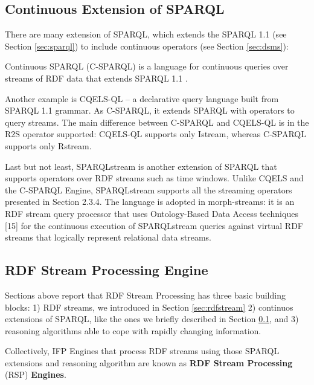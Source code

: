 \subsection{Continuous Extension of SPARQL}\label{sec:continuous-sparql}

There are many extension of SPARQL, which extends the SPARQL 1.1 (see Section \ref{sec:sparql}) to include continuous operators (see Section \ref{sec:dsms}):

Continuous SPARQL (C-SPARQL)  is a language for continuous queries over streams of RDF data that extends SPARQL 1.1 \cite{Barbieri:2010:QRS:1860702.1860705}.

Another example is CQELS-QL \cite{Lephuoc2011} – a declarative query language built from SPARQL 1.1 grammar. As C-SPARQL, it extends SPARQL with operators to query streams. The main difference between C-SPARQL and CQELS-QL is in the R2S operator supported: CQELS-QL supports only Istream, whereas C-SPARQL supports only Rstream. 

Last but not least, SPARQLstream \cite{Calbimonte:2010:EOA:1940281.1940289} is another extension of SPARQL that supports operators over RDF streams such as time windows. Unlike CQELS and the C-SPARQL Engine, SPARQLstream supports all the streaming operators presented in Section 2.3.4. The language is adopted in morph-streams: it is an RDF stream query processor that uses Ontology-Based Data Access techniques [15] for the continuous execution of SPARQLstream queries against virtual RDF streams that logically represent relational data streams.

\subsection{RDF Stream Processing Engine}\label{sec:rspengine}

Sections above report that RDF Stream Processing has three basic building blocks: 1) RDF streams, we introduced in Section \ref{sec:rdfstream} 2) continuos extensions of SPARQL, like the ones we briefly described in Section \ref{sec:continuous-sparql}, and 3) reasoning algorithms able to cope with rapidly changing information.

Collectively, IFP Engines that process RDF streams using those SPARQL extensions and reasoning algorithm are known as \textbf{RDF Stream Processing} (RSP) \textbf{Engines}.

